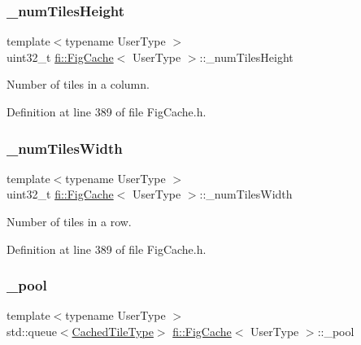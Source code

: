 \subsubsection{\texorpdfstring{\+\_\+num\+Tiles\+Height}{\_numTilesHeight}}
{\footnotesize\ttfamily template$<$typename User\+Type $>$ \\
uint32\+\_\+t \hyperlink{classfi_1_1FigCache}{fi\+::\+Fig\+Cache}$<$ User\+Type $>$\+::\+\_\+num\+Tiles\+Height\hspace{0.3cm}{\ttfamily [private]}}



Number of tiles in a column. 



Definition at line 389 of file Fig\+Cache.\+h.

\mbox{\label{classfi_1_1FigCache_a7bad6e0aef83aeb7dcf8bf9ea74d445c}} 
\subsubsection{\texorpdfstring{\+\_\+num\+Tiles\+Width}{\_numTilesWidth}}
{\footnotesize\ttfamily template$<$typename User\+Type $>$ \\
uint32\+\_\+t \hyperlink{classfi_1_1FigCache}{fi\+::\+Fig\+Cache}$<$ User\+Type $>$\+::\+\_\+num\+Tiles\+Width\hspace{0.3cm}{\ttfamily [private]}}



Number of tiles in a row. 



Definition at line 389 of file Fig\+Cache.\+h.

\mbox{\label{classfi_1_1FigCache_a3ae812e7601663ffaa14400d78c3f9c2}} 
\subsubsection{\texorpdfstring{\+\_\+pool}{\_pool}}
{\footnotesize\ttfamily template$<$typename User\+Type $>$ \\
std\+::queue$<$\hyperlink{classfi_1_1FigCache_a7b9bbc4a832c01c3a461f573445c3c41}{Cached\+Tile\+Type}$>$ \hyperlink{classfi_1_1FigCache}{fi\+::\+Fig\+Cache}$<$ User\+Type $>$\+::\+\_\+pool\hspace{0.3cm}{\ttfamily [private]}}



